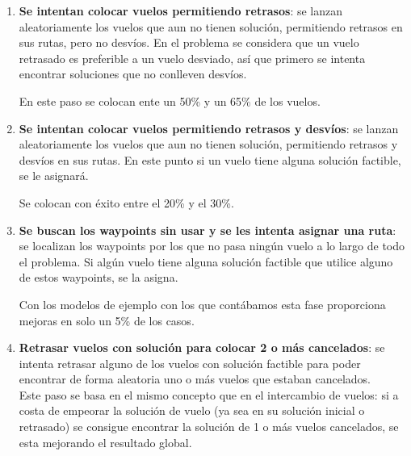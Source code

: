 \begin{enumerate}
	\item \textbf{Se intentan colocar vuelos permitiendo retrasos}: se lanzan aleatoriamente los vuelos que aun no tienen solución, permitiendo retrasos en sus rutas, pero no desvíos.	En el problema se considera que un vuelo retrasado es preferible a un vuelo desviado, así que primero se intenta encontrar soluciones que no conlleven desvíos.
	
	En este paso se colocan ente un 50\% y un 65\% de los vuelos.
	
	\item \textbf{Se intentan colocar vuelos permitiendo retrasos y desvíos}: se lanzan aleatoriamente los vuelos que aun no tienen solución, permitiendo retrasos y desvíos en sus rutas. En este punto si un vuelo tiene alguna solución factible, se le asignará. 
	
	Se colocan con éxito entre el 20\% y el 30\%.
	
	\item \textbf{Se buscan los waypoints sin usar y se les intenta asignar una ruta}: se localizan los waypoints por los que no pasa ningún vuelo a lo largo de todo el problema. Si algún vuelo tiene alguna solución factible que utilice alguno de estos waypoints, se la asigna. 
	
	Con los modelos de ejemplo con los que contábamos esta fase proporciona mejoras en solo un 5\% de los casos.
	
	\item \textbf{Retrasar vuelos con solución para colocar 2 o más cancelados}: se intenta retrasar alguno de los vuelos con solución factible para poder encontrar de forma aleatoria uno o más vuelos que estaban cancelados.\\
	Este paso se basa en el mismo concepto que en el intercambio de vuelos: si a costa de empeorar la solución de vuelo (ya sea en su solución inicial o retrasado) se consigue encontrar la solución de 1 o más vuelos cancelados, se esta mejorando el resultado global.
	
\end{enumerate}
